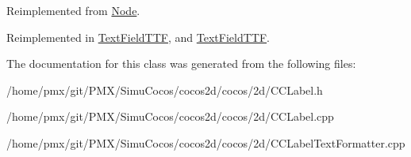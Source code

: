 Reimplemented from \hyperlink{classNode_a7d794a5e30745611ec33881a625edf26}{Node}.



Reimplemented in \hyperlink{classTextFieldTTF_a4e4d61648a15b14774923fc8d2738683}{Text\+Field\+T\+TF}, and \hyperlink{classTextFieldTTF_af7cb31f513a3699cac12a42aebcd8bec}{Text\+Field\+T\+TF}.



The documentation for this class was generated from the following files\+:\begin{DoxyCompactItemize}
\item 
/home/pmx/git/\+P\+M\+X/\+Simu\+Cocos/cocos2d/cocos/2d/C\+C\+Label.\+h\item 
/home/pmx/git/\+P\+M\+X/\+Simu\+Cocos/cocos2d/cocos/2d/C\+C\+Label.\+cpp\item 
/home/pmx/git/\+P\+M\+X/\+Simu\+Cocos/cocos2d/cocos/2d/C\+C\+Label\+Text\+Formatter.\+cpp\end{DoxyCompactItemize}

